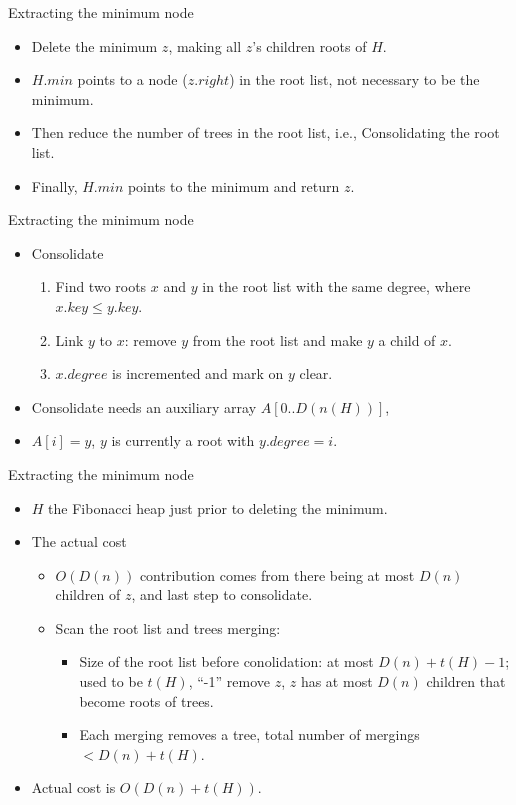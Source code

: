 \documentclass{beamer}
\begin{document}
\begin{frame}{Extracting the minimum node}
\vspace{0.5cm}
\begin{itemize}
\item Delete the minimum $z$, making all $z$'s children roots of $H$. 
\item $H.min$ points to a node ($z.right$) in the root list, not necessary to be the minimum. 
\item Then reduce the number of trees in the root list, i.e., Consolidating the root list. 
\item Finally, $H.min$ points to the minimum and return $z$. 
\end{itemize}
\end{frame}

\begin{frame}{Extracting the minimum node}
\vspace{0.5cm}
\begin{itemize}
\item {\sc Consolidate}
\begin{enumerate}
\item Find two roots $x$ and $y$ in the root list with the same degree, where $x.key\le y.key$. 
\item Link $y$ to $x$: remove $y$ from the root list and make $y$ a child of $x$. 
\item $x.degree$ is incremented and mark on $y$ clear. 
\end{enumerate}
\item {\sc Consolidate} needs an auxiliary array $A[0..D(n(H))]$,
\item $A[i]=y$, $y$ is currently a root with $y.degree=i$. 
\end{itemize}
\end{frame}

\begin{frame}{Extracting the minimum node}
\begin{itemize}
\item $H$ the Fibonacci heap just prior to deleting the minimum.
\item The actual cost
\begin{itemize}
\item $O(D(n))$ contribution comes from there being at most $D(n)$ children of $z$, and last step to 
 consolidate.
\item Scan the root list and trees merging:
\begin{itemize}
\item Size of the root list before conolidation: at most $D(n)+t(H)-1$; used to be $t(H)$, ``-1''
 remove $z$, $z$ has at most $D(n)$ children that become roots of trees.
\item Each merging removes a tree, total number of mergings $<D(n)+t(H)$.
\end{itemize}
\end{itemize}
\item Actual cost is $O(D(n)+t(H))$. 
\end{itemize}
\end{frame}
\end{document}
